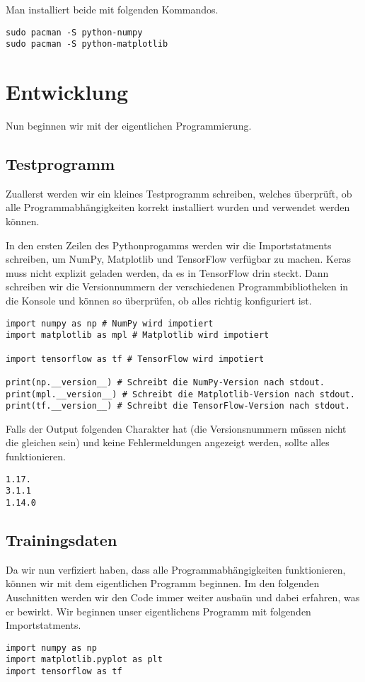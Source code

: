 Man installiert beide mit folgenden Kommandos.
\begin{verbatim}
sudo pacman -S python-numpy
sudo pacman -S python-matplotlib
\end{verbatim}

\section{Entwicklung}
Nun beginnen wir mit der eigentlichen Programmierung.

\subsection{Testprogramm}
Zuallerst werden wir ein kleines Testprogramm schreiben, welches überprüft, ob
alle Programmabhängigkeiten korrekt installiert wurden und verwendet werden können.

In den ersten Zeilen des Pythonprogamms werden wir die Importstatments
schreiben, um NumPy, Matplotlib und TensorFlow verfügbar zu machen.
Keras muss nicht explizit geladen werden, da es in TensorFlow drin steckt.
Dann schreiben wir die Versionnummern der verschiedenen Programmbibliotheken
in die Konsole und können so überprüfen, ob alles richtig konfiguriert ist.
\begin{verbatim}
import numpy as np # NumPy wird impotiert
import matplotlib as mpl # Matplotlib wird impotiert

import tensorflow as tf # TensorFlow wird impotiert

print(np.__version__) # Schreibt die NumPy-Version nach stdout.
print(mpl.__version__) # Schreibt die Matplotlib-Version nach stdout.
print(tf.__version__) # Schreibt die TensorFlow-Version nach stdout.
\end{verbatim}
Falls der Output folgenden Charakter hat (die Versionsnummern müssen nicht
die gleichen sein) und keine Fehlermeldungen angezeigt
werden, sollte alles funktionieren.
\begin{verbatim}
1.17.
3.1.1
1.14.0
\end{verbatim}
\para{}

\subsection{Trainingsdaten}
Da wir nun verfiziert haben, dass alle Programmabhängigkeiten funktionieren,
können wir mit dem eigentlichen Programm beginnen.
\para{}
Im den folgenden Auschnitten werden wir den Code immer weiter ausbaün und dabei
erfahren, was er bewirkt. Wir beginnen unser eigentlichens Programm mit folgenden Importstatments.
\begin{verbatim}
import numpy as np
import matplotlib.pyplot as plt
import tensorflow as tf
\end{verbatim}

